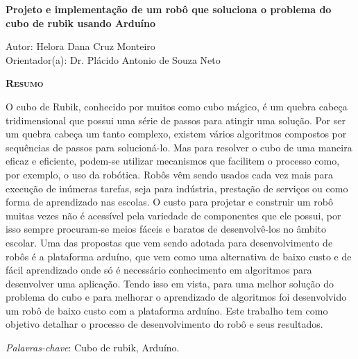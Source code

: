 \begin{center}
	{\Large{\textbf{Projeto e implementação de um robô que soluciona o problema do cubo de rubik usando Arduíno}}}
\end{center}

\vspace{1cm}

\begin{flushright}
	Autor: Helora Dana Cruz Monteiro\\
	Orientador(a): Dr. Plácido Antonio de Souza Neto
\end{flushright}

\vspace{1cm}

\begin{center}
	\Large{\textsc{\textbf{Resumo}}}
\end{center}

\noindent 
O cubo de Rubik, conhecido por muitos como cubo mágico, é um quebra cabeça tridimensional que possui uma série de passos para atingir uma solução. Por ser um quebra cabeça um tanto complexo, existem vários algoritmos compostos por sequências de passos para solucioná-lo. Mas para resolver o cubo de uma maneira eficaz e eficiente, podem-se utilizar mecanismos que facilitem o processo como, por exemplo, o uso da robótica. Robôs vêm sendo usados cada vez mais para execução de inúmeras tarefas, seja para indústria, prestação de serviços ou como forma de aprendizado nas escolas. O custo para projetar e construir um robô muitas vezes não é acessível pela variedade de componentes que ele possui, por isso sempre procuram-se meios fáceis e baratos de desenvolvê-los no âmbito escolar. Uma das propostas que vem sendo adotada para desenvolvimento de robôs é a plataforma arduíno, que vem como uma alternativa de baixo custo e de fácil aprendizado  onde só é necessário conhecimento em algoritmos para desenvolver uma aplicação. Tendo isso em vista, para uma melhor solução do problema do cubo e para melhorar o aprendizado de algoritmos foi desenvolvido um robô de baixo custo com a plataforma arduíno. Este trabalho tem como objetivo detalhar o processo de desenvolvimento do robô e seus resultados. 

\noindent\textit{Palavras-chave}: Cubo de rubik, Arduíno.